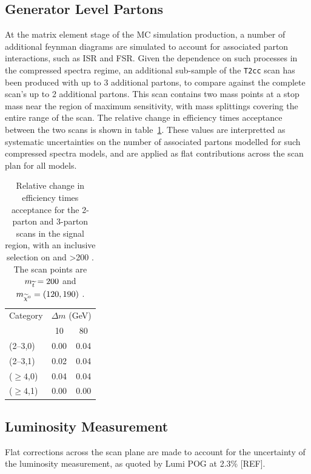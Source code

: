 \subsection{Generator Level Partons}
At the \MADGRAPH matrix element stage of the MC simulation production, a number
of additional feynman diagrams are simulated to account for associated parton 
interactions, such as ISR and FSR. Given the dependence on such processes in the
compressed spectra regime, an additional sub-sample of the \texttt{T2cc} scan 
has been produced with up to 3 additional partons, to compare against the 
complete scan's up to 2 additional partons. This scan contains two mass points 
at a stop mass near the region of maximum sensitivity, with mass splittings 
covering the entire range of the scan. The relative change in efficiency times 
acceptance between the two scans is shown in table~\ref{tab:sms-t2cc-2v3part}. 
These values are interpretted as systematic uncertainties on the number of 
associated partons modelled for such compressed spectra models, and are applied 
as flat contributions across the scan plan for all models.

\begin{table}[!h]
  \caption{Relative change in efficiency times acceptance for the
    2-parton and 3-parton scans in the signal region, with an inclusive 
    selection on \nb and \HT>200 \gev. The scan points are $m_{\widetilde{t}} = 200$ \gev 
    and $m_{\widetilde{\chi}^{0}} = (120, 190)$ \gev.}
  \label{tab:sms-t2cc-2v3part}
  \centering
  \small
  \begin{tabular}{ lcc }
    \hline
    \hline
    Category     & \multicolumn{2}{c}{$\Delta m$ (GeV)} \\
    \cline{2-3}
                 & 10   & 80                            \\
    \hline
    (2--3,0)     & 0.00 & 0.04                          \\
    (2--3,1)     & 0.02 & 0.04                          \\
    ($\geq 4$,0) & 0.04 & 0.04                          \\
    ($\geq 4$,1) & 0.00 & 0.00                          \\
    \hline
    \hline
  \end{tabular}
\end{table}


\subsection{Luminosity Measurement}
Flat corrections across the scan plane are made to account for the uncertainty 
of the luminosity measurement, as quoted by Lumi POG at 2.3\% [REF].

